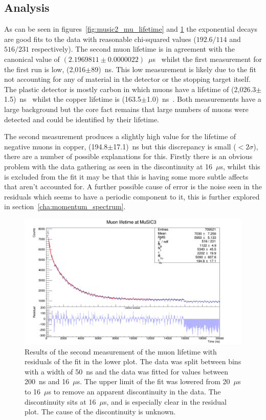 \subsection{Analysis} %
\label{sec:analysis}
As can be seen in figures~\ref{fig:music2_mu_lifetime} and \ref{fig:music3_muon_lifetime} the exponential decays are good fits to the data with reasonable chi-squared values (\(192.6/114\) and \( 516/231 \) respectively). The second muon lifetime is in agreement with the canonical value of \((2.1969811\pm0.0000022)\)~\(\mu\)s~\cite{pdg} whilst the first measurement for the first run is low, (2,016\(\pm\)89)~ns. This low measurement is likely due to the fit not accounting for any of material in the detector or the stopping target itself. The plastic detector is mostly carbon in which muons have a lifetime of (2,026.3\(\pm\)1.5)~ns~\cite{suzuki_mu_capture_rates} whilst the copper lifetime is (163.5\(\pm\)1.0)~ns~\cite{suzuki_mu_capture_rates}. Both measurements have a large background but the core fact remains that large numbers of muons were detected and could be identified by their lifetime.

The second measurement produces a slightly high value for the lifetime of negative muons in copper, (194.8\(\pm\)17.1)~ns but this discrepancy is small (\(<2\sigma\)), there are a number of possible explanations for this. Firstly there is an obvious problem with the data gathering as seen in the discontinuity at 16~\(\mu\)s, whilst this is excluded from the fit it may be that this is having some more subtle affects that aren't accounted for. A further possible cause of error is the noise seen in the residuals which seems to have a periodic component to it, this is further explored in section~\ref{cha:momentum_spectrum}.

\begin{figure}[hptb]
  \centering
  \includegraphics[width=.9\textwidth]{images/lifetime/music3_muon_lifetime.png}
  \caption{Results of the second measurement of the muon lifetime with residuals of the fit in the lower plot. The data was split between bins with a width of 50~ns and the data was fitted for values between 200~ns and 16~\(\mu\)s. The upper limit of the fit was lowered from 20~\(\mu\)s to 16~\(\mu\)s to remove an apparent discontinuity in the data. The discontinuity sits at 16~\(\mu\)s, and is especially clear in the residual plot. The cause of the discontinuity is unknown.}
  \label{fig:music3_muon_lifetime}
\end{figure}

